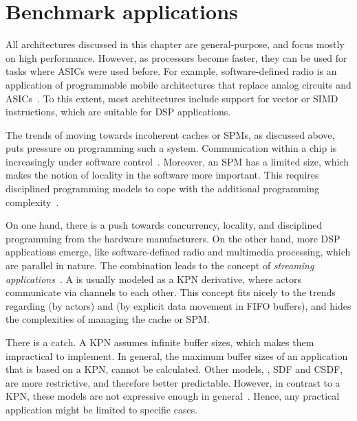 \section{Benchmark applications}
\label{s:starburst:apps}

All architectures discussed in this chapter are general-purpose, and focus mostly on high performance.
However, as processors become faster, they can be used for tasks where \acp{ASIC} were used before.
For example, software-defined radio is an application of programmable mobile architectures that replace analog circuits and \acp{ASIC}~\cite{abidi:sdr}.
To this extent, most architectures include support for vector or \ac{SIMD} instructions, which are suitable for \ac{DSP} applications.

The trends of moving towards incoherent caches or \acp{SPM}, as discussed above, puts pressure on programming such a system.
Communication within a chip is increasingly under software control~\cite{borkar:future}.
Moreover, an \ac{SPM} has a limited size, which makes the notion of locality in the software more important.
This requires disciplined programming models to cope with the additional programming complexity~\cite{choi:denovo}.

On one hand, there is a push towards concurrency, locality, and disciplined programming from the hardware manufacturers.
On the other hand, more \ac{DSP} applications emerge, like software-defined radio and multimedia processing, which are parallel in nature.
The combination leads to the concept of \emph{streaming applications}~\cite{thies:streamit}.
A  is usually modeled as a \ac{KPN} derivative, where actors communicate via channels to each other.
This concept fits nicely to the trends regarding  (by actors) and  (by explicit data movement in \ac{FIFO} buffers), and hides the complexities of managing the cache or \ac{SPM}.

There is a catch.
A \ac{KPN} assumes infinite buffer sizes, which makes them impractical to implement.
In general, the maximum buffer sizes of an application that is based on a \ac{KPN}, cannot be calculated.
Other models, \eg, \acs{SDF} and \acs{CSDF}, are more restrictive, and therefore better predictable.
However, in contrast to a \ac{KPN}, these models are not expressive enough in general~\cite{pelcat:dataflow}.
Hence, any practical application might be limited to specific cases.

